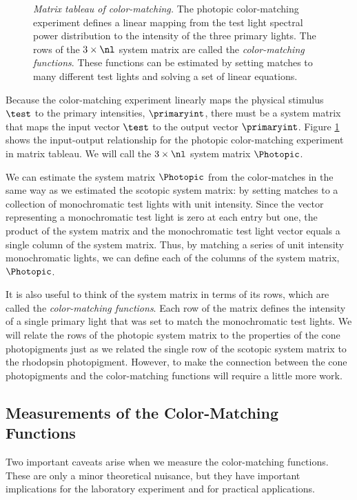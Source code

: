 \begin{figure}
\centerline {
}
\caption[Color Matching Matrix Tableau]{
{\em Matrix tableau of color-matching.}
The photopic color-matching experiment defines a
linear mapping from the test light spectral power distribution
to the intensity of the three primary lights.
The rows of the $3 \times \nl$ system matrix are called
the {\em color-matching functions}.
These functions can be estimated by setting matches to many different
test lights and solving a set of linear equations.
}
\label{f3:photopic}
\end{figure}
Because the color-matching experiment
linearly maps the physical stimulus $\test$
to the primary intensities, $\primaryint$,
there must be a system matrix that maps the input vector
$\test$ to the output vector $\primaryint$.
Figure \ref{f3:photopic} shows the input-output relationship
for the photopic color-matching experiment in matrix tableau.
We will call the $3 \times \nl$ system matrix $\Photopic$.

We can estimate the system
matrix $\Photopic$ from the color-matches in the
same way as we estimated the scotopic system matrix:
by setting matches to a collection of monochromatic test lights
with unit intensity.
Since the vector representing a monochromatic test light
is zero at each entry but one,
the product of the system matrix and the monochromatic test light
vector equals a single column of the system matrix.
Thus, by matching a series of unit intensity monochromatic lights,
we can define each of the columns of the system matrix, $\Photopic$.

It is also useful to think of the system matrix
in terms of its rows, which
are called the {\em color-matching functions}.
Each row of the matrix
defines the intensity of a single primary light
that was set to match the monochromatic test lights.
We will relate the rows of the photopic system matrix
to the properties of the cone photopigments just as we related
the single row of the scotopic system matrix to the
rhodopsin photopigment.
However, to make the connection between the cone photopigments and the
color-matching functions will require a little more work.

\subsection*{Measurements of the Color-Matching Functions}
Two important caveats arise
when we measure the color-matching functions.
These are only a minor theoretical nuisance,
but they have important implications for the laboratory experiment
and for practical applications.

